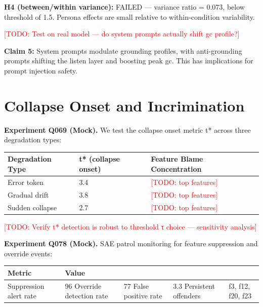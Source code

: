\documentclass[a4paper]{article}
\begin{document}
{{\textbf{H4 (between/within variance):} FAILED — variance ratio = 0.073, below threshold of 1.5. Persona effects are small relative to within-condition variability.

\textcolor{red}{[TODO: Test on real model — do system prompts actually shift gc profile?]}

\textbf{Claim 5:} System prompts modulate grounding profiles, with anti-grounding prompts shifting the listen layer and boosting peak gc. This has implications for prompt injection safety.


\section{Collapse Onset and Incrimination}

\textbf{Experiment Q069 (Mock).} We test the collapse onset metric t* across three degradation types:

\begin{table}[htbp]
\centering
\begin{tabular}{lll}
\toprule
Degradation Type & t* (collapse onset) & Feature Blame Concentration \\
\midrule
Error token & 3.4 & \textcolor{red}{[TODO: top features]} \\
Gradual drift & 3.8 & \textcolor{red}{[TODO: top features]} \\
Sudden collapse & 2.7 & \textcolor{red}{[TODO: top features]} \\
\bottomrule
\end{tabular}
\end{table}

\textcolor{red}{[TODO: Verify t* detection is robust to threshold τ choice — sensitivity analysis]}

\textbf{Experiment Q078 (Mock).} SAE patrol monitoring for feature suppression and override events:

\begin{table}[htbp]
\centering
\begin{tabular}{ll}
\toprule
Metric & Value \\
\midrule
Suppression alert rate & 96%
Override detection rate & 77%
False positive rate & 3.3%
Persistent offenders & f3, f12, f20, f23 \\
\bottomrule
\end{tabular}
\end{table}

}}
\end{document}
